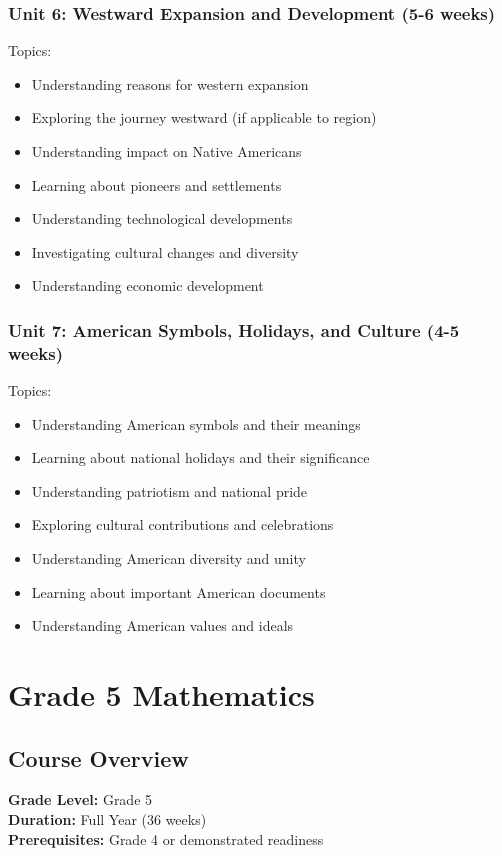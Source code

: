 \documentclass[11pt,letterpaper]{report}
\begin{document}
\subsection{Unit 6: Westward Expansion and Development (5-6 weeks)}

Topics:
\begin{itemize}
\item Understanding reasons for western expansion
\item Exploring the journey westward (if applicable to region)
\item Understanding impact on Native Americans
\item Learning about pioneers and settlements
\item Understanding technological developments
\item Investigating cultural changes and diversity
\item Understanding economic development
\end{itemize}

\subsection{Unit 7: American Symbols, Holidays, and Culture (4-5 weeks)}

Topics:
\begin{itemize}
\item Understanding American symbols and their meanings
\item Learning about national holidays and their significance
\item Understanding patriotism and national pride
\item Exploring cultural contributions and celebrations
\item Understanding American diversity and unity
\item Learning about important American documents
\item Understanding American values and ideals
\end{itemize}

\chapter{Grade 5 Mathematics}

\section{Course Overview}

\textbf{Grade Level:} Grade 5\\
\textbf{Duration:} Full Year (36 weeks)\\
\textbf{Prerequisites:} Grade 4 or demonstrated readiness
\end{document}
